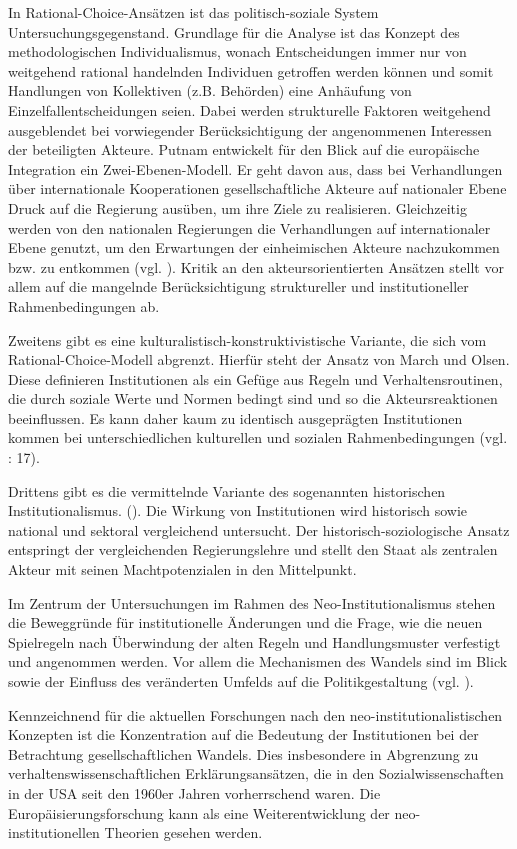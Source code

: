 In Rational-Choice-Ansätzen ist das politisch-soziale System Untersuchungsgegenstand. Grundlage für die Analyse ist das Konzept des methodologischen Individualismus, wonach Entscheidungen immer nur von weitgehend rational handelnden Individuen getroffen werden können und somit Handlungen von Kollektiven (z.B. Behörden) eine Anhäufung von Einzelfallentscheidungen seien. Dabei werden strukturelle Faktoren weitgehend ausgeblendet bei vorwiegender Berücksichtigung der angenommenen Interessen der beteiligten Akteure. Putnam entwickelt für den Blick auf die europäische Integration ein Zwei-Ebenen-Modell. Er geht davon aus, dass bei Verhandlungen über internationale Kooperationen gesellschaftliche Akteure auf nationaler Ebene Druck auf die Regierung ausüben, um ihre Ziele zu realisieren. Gleichzeitig werden von den nationalen Regierungen die Verhandlungen auf internationaler Ebene genutzt, um den Erwartungen der einheimischen Akteure nachzukommen bzw. zu entkommen (vgl. \cite{putnam}). Kritik an den akteursorientierten Ansätzen stellt vor allem auf die mangelnde Berücksichtigung struktureller und institutioneller Rahmenbedingungen ab.\par
Zweitens gibt es eine kulturalistisch-konstruktivistische Variante, die sich vom Rational-Choice-Modell abgrenzt. Hierfür steht der Ansatz von March und Olsen. Diese definieren Institutionen als ein Gefüge aus Regeln und Verhaltensroutinen, die durch soziale Werte und Normen bedingt sind und so die Akteursreaktionen beeinflussen. Es kann daher kaum zu identisch ausgeprägten Institutionen kommen bei unterschiedlichen kulturellen und sozialen Rahmenbedingungen (vgl. \cite{marols} : 17).\par
Drittens gibt es die vermittelnde Variante des sogenannten historischen Institutionalismus. (\cite{haltay, steinmo}). Die Wirkung von Institutionen wird historisch sowie national und sektoral vergleichend untersucht. Der historisch-soziologische Ansatz entspringt der vergleichenden Regierungslehre und stellt den Staat als zentralen Akteur mit seinen Machtpotenzialen in den Mittelpunkt.\par
Im Zentrum der Untersuchungen im Rahmen des Neo-Institutionalismus stehen die Beweggründe für institutionelle Änderungen und die Frage, wie die neuen Spielregeln nach Überwindung der alten Regeln und Handlungsmuster verfestigt und angenommen werden. Vor allem die Mechanismen des Wandels sind im Blick sowie der Einfluss des veränderten Umfelds auf die Politikgestaltung (vgl. \cite{huszak}).\par
Kennzeichnend für die aktuellen Forschungen nach den neo-institutionalistischen Konzepten ist die Konzentration auf die Bedeutung der Institutionen bei der Betrachtung gesellschaftlichen Wandels. Dies insbesondere in Abgrenzung zu verhaltenswissenschaftlichen Erklärungsansätzen, die in den Sozialwissenschaften in der USA seit den 1960er Jahren vorherrschend waren. Die Europäisierungsforschung kann als eine Weiterentwicklung der neo-institutionellen Theorien gesehen werden. \par
